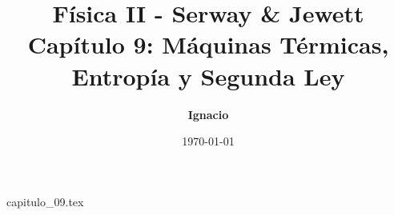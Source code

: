 \documentclass[11pt,spanish,oneside]{report}
\title{\textbf{Física II - Serway \& Jewett} \\ \Large Capítulo 9: Máquinas Térmicas, Entropía y Segunda Ley}
\author{\textbf{Ignacio}}
\date{\today}
\begin{document}
\maketitle

{capitulo_09.tex}
\end{document}
